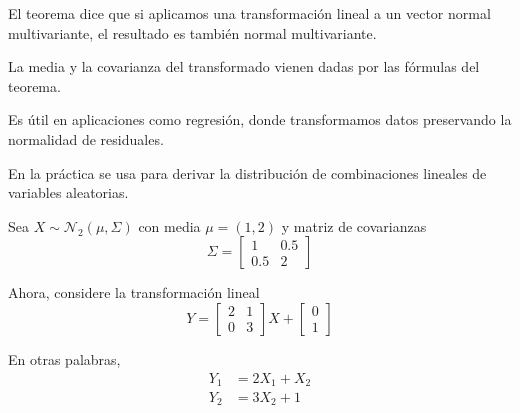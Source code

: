 \documentclass[
  11pt,
  ignorenonframetext,
  aspectratio=169]{beamer}
\theoremstyle{plain}
\theoremstyle{definition}
\theoremstyle{remark}
\begin{document}
\begin{frame}{}
\label{section-12}
\begin{remark} 
El teorema dice que si aplicamos una transformación lineal a un vector normal multivariante, el resultado es también normal multivariante.

\bigpause 

La media y la covarianza del transformado vienen dadas por las fórmulas del teorema.

\bigpause

Es útil en aplicaciones como regresión, donde transformamos datos preservando la normalidad de residuales.

\bigpause

En la práctica se usa para derivar la distribución de combinaciones lineales de variables aleatorias.

\end{remark}
\end{frame}

\begin{frame}{}
\label{section-13}
\begin{example} 
Sea $X \sim \mathcal{N}_{2}(\mu, \Sigma)$ con media $\mu = (1, 2)$ y matriz de covarianzas 
$$ 
\Sigma = \left[ 
\begin{array}{cc} 
1 & 0.5 \\ 
0.5 & 2 
\end{array} 
\right] 
$$ 

\pause

Ahora, considere la transformación lineal 
$$ 
Y = \begin{bmatrix} 2 & 1 \\ 0 & 3 \end{bmatrix} X + \begin{bmatrix} 0 \\ 1 \end{bmatrix} 
$$ 

\pause

En otras palabras, 
\begin{align*}
Y_1 & = 2X_1 + X_2 \\ 
Y_2 & = 3X_2 + 1 
\end{align*}
\end{example}
\end{frame}
\end{document}
